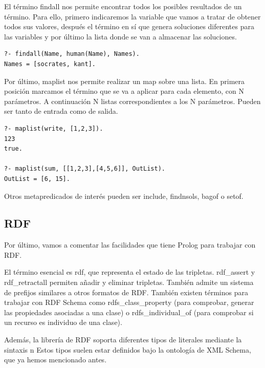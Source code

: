 \documentclass[12pt]{report} %
\begin{document}
El término findall nos permite encontrar todos los posibles resultados de un término. Para ello, primero indicaremos la variable que vamos a tratar de obtener todos sus valores, después el término en sí que genera soluciones diferentes para las variables y por último la lista donde se van a almacenar las soluciones.

\begin{lstlisting}
?- findall(Name, human(Name), Names).
Names = [socrates, kant].
\end{lstlisting}

Por último, maplist nos permite realizar un map sobre una lista. En primera posición marcamos el término que se va a aplicar para cada elemento, con N parámetros. A continuación N listas correspondientes a los N parámetros. Pueden ser tanto de entrada como de salida.

\begin{lstlisting}
?- maplist(write, [1,2,3]).
123
true.

?- maplist(sum, [[1,2,3],[4,5,6]], OutList).
OutList = [6, 15].
\end{lstlisting}

Otros metapredicados de interés pueden ser include, findnsols, bagof o setof.

\subsection{RDF}

Por último, vamos a comentar las facilidades que tiene Prolog para trabajar con RDF.

El término esencial es rdf, que representa el estado de las tripletas. rdf\_assert y rdf\_retractall permiten añadir y eliminar tripletas. También admite un sistema de prefijos similares a otros formatos de RDF. También existen términos para trabajar con RDF Schema como rdfs\_class\_property (para comprobar, generar las propiedades asociadas a una clase) o rdfs\_individual\_of (para comprobar si un recurso es individuo de una clase).

Además, la librería de RDF soporta diferentes tipos de literales mediante la sintaxis ^^. Estos tipos suelen estar definidos bajo la ontología de XML Schema, que ya hemos mencionado antes.
\end{document}
